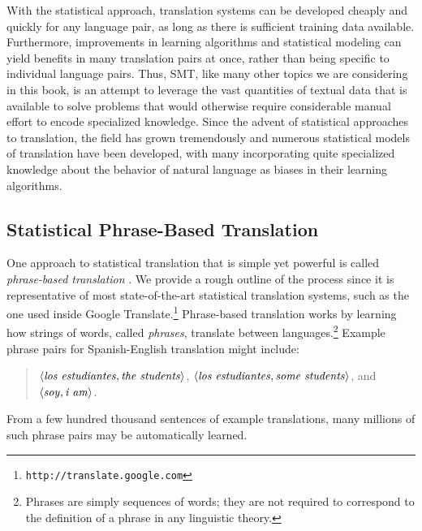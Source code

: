 With the statistical approach, translation systems can be developed
cheaply and quickly for any language pair, as long as there is
sufficient training data available.  Furthermore, improvements in
learning algorithms and statistical modeling can yield benefits in
many translation pairs at once, rather than being specific to
individual language pairs.  Thus, SMT, like many other topics we are
considering in this book, is an attempt to leverage the vast
quantities of textual data that is available to solve problems that
would otherwise require considerable manual effort to encode
specialized knowledge. Since the advent of statistical approaches to
translation, the field has grown tremendously and numerous statistical
models of translation have been developed, with many incorporating
quite specialized knowledge about the behavior of natural language as
biases in their learning algorithms.

\subsection{Statistical Phrase-Based Translation}

One approach to statistical translation that is simple yet powerful is
called \emph{phrase-based translation} \cite{Koehn_2003}.  We provide
a rough outline of the process since it is representative of most
state-of-the-art statistical translation systems, such as the one used
inside Google Translate.\footnote{\texttt{http://translate.google.com}}
Phrase-based translation works by learning how strings of words,
called \emph{phrases}, translate between languages.\footnote{Phrases
  are simply sequences of words; they are not required to correspond
  to the definition of a phrase in any linguistic theory.}  Example
phrase pairs for Spanish-English translation might include:

\begin{quote}
$\langle \textrm{\emph{los estudiantes}}, \textrm{\emph{the students}}\rangle$,
$\langle \textrm{\emph{los estudiantes}}, \textrm{\emph{some
    students}}\rangle$, and $\langle \textrm{\emph{soy}},
\textrm{\emph{i am}} \rangle$.
\end{quote}

\noindent From a few hundred thousand sentences
of example translations, many millions of such phrase pairs may be
automatically learned.

